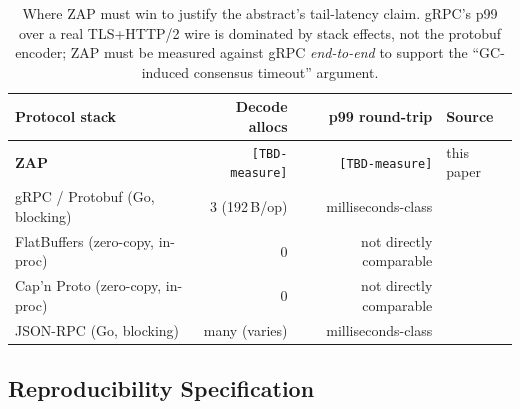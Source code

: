 \begin{table}[h]
\centering
\small
\begin{tabular}{@{}lrrl@{}}
\toprule
\textbf{Protocol stack} & \textbf{Decode allocs} & \textbf{p99 round-trip} & \textbf{Source} \\
\midrule
\textbf{ZAP}                       & \texttt{[TBD-measure]} & \texttt{[TBD-measure]} & this paper \\
\midrule
gRPC / Protobuf (Go, blocking)     & 3 (192\,B/op)        & milliseconds-class       & \cite{kcchubuffer,grpcperformance} \\
FlatBuffers (zero-copy, in-proc)   & 0                    & not directly comparable  & \cite{chronoxorbench} \\
Cap'n Proto (zero-copy, in-proc)   & 0                    & not directly comparable  & \cite{kcchubuffer} \\
JSON-RPC (Go, blocking)            & many (varies)        & milliseconds-class       & \cite{kcchubuffer} \\
\bottomrule
\end{tabular}
\caption{Where ZAP must win to justify the abstract's tail-latency claim.
gRPC's p99 over a real TLS+HTTP/2 wire is dominated by stack effects,
not the protobuf encoder; ZAP must be measured against gRPC \emph{end-to-end}
to support the ``GC-induced consensus timeout'' argument.}
\label{tab:zap-lit-tail}
\end{table}

\subsection{Reproducibility Specification}
\label{sec:zap-repro}

